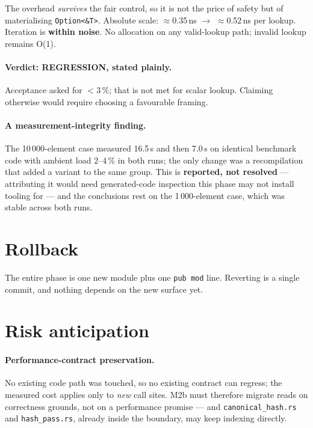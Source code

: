 \documentclass[11pt,a4paper]{article}
\newcommand{\code}[1]{\texttt{#1}}
\begin{document}
\noindent
The overhead \emph{survives} the fair control, so it is not the price of safety
but of materialising \code{Option<\&T>}. Absolute scale:
$\approx$0.35\,ns $\rightarrow$ $\approx$0.52\,ns per lookup. Iteration is
\textbf{within noise}. No allocation on any valid-lookup path; invalid lookup
remains O(1).

\paragraph{Verdict: REGRESSION, stated plainly.} Acceptance asked for
$<3\,\%$; that is not met for scalar lookup. Claiming otherwise would require
choosing a favourable framing.

\paragraph{A measurement-integrity finding.} The 10\,000-element case measured
16.5\,\textmu s and then 7.0\,\textmu s on identical benchmark code with
ambient load 2--4\,\% in both runs; the only change was a recompilation that
added a variant to the same group. This is \textbf{reported, not resolved} ---
attributing it would need generated-code inspection this phase may not install
tooling for --- and the conclusions rest on the 1\,000-element case, which was
stable across both runs.

\section{Rollback}

The entire phase is one new module plus one \code{pub mod} line. Reverting is a
single commit, and nothing depends on the new surface yet.

\section{Risk anticipation}

\paragraph{Performance-contract preservation.} No existing code path was
touched, so no existing contract can regress; the measured cost applies only to
\emph{new} call sites. M2b must therefore migrate reads on correctness grounds,
not on a performance promise --- and \code{canonical\_hash.rs} and
\code{hash\_pass.rs}, already inside the boundary, may keep indexing directly.
\end{document}
